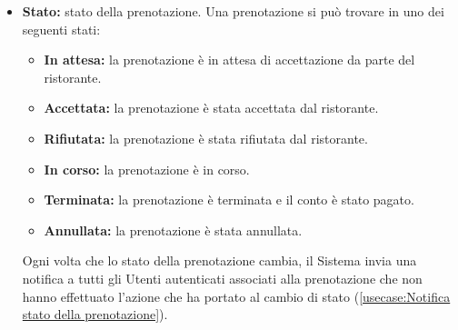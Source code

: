 \begin{itemize}
\begin{itemize}
		      \item \textbf{Stato:} stato della prenotazione. Una
		            prenotazione si può trovare in uno dei seguenti stati:
		            \begin{itemize}
			            \item \textbf{In attesa:} la prenotazione è
			                  in attesa di accettazione da parte del ristorante.

			            \item \textbf{Accettata:} la prenotazione è
			                  stata accettata dal ristorante.

			            \item \textbf{Rifiutata:} la prenotazione è
			                  stata rifiutata dal ristorante.

			            \item \textbf{In corso:} la prenotazione è
			                  in corso.

			            \item \textbf{Terminata:} la prenotazione è
			                  terminata e il conto è stato pagato.
						\item \textbf{Annullata:} la prenotazione è stata
			                  annullata.
		            \end{itemize}

		            Ogni volta che lo stato della prenotazione cambia, il Sistema
		            invia una notifica a tutti gli Utenti autenticati associati alla
		            prenotazione che non hanno effettuato l'azione che ha portato al
		            cambio di stato (\autoref{usecase:Notifica stato della prenotazione}).
	      \end{itemize}

\end{itemize}
